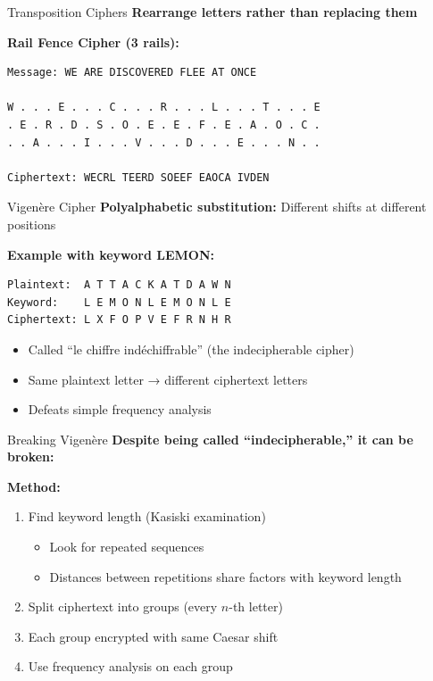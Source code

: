 \documentclass{beamer}
\begin{document}
\begin{frame}[fragile]{Transposition Ciphers}
\textbf{Rearrange letters rather than replacing them}

\vspace{0.3cm}
\textbf{Rail Fence Cipher (3 rails):}

\begin{verbatim}
Message: WE ARE DISCOVERED FLEE AT ONCE

W . . . E . . . C . . . R . . . L . . . T . . . E
. E . R . D . S . O . E . E . F . E . A . O . C .
. . A . . . I . . . V . . . D . . . E . . . N . .

Ciphertext: WECRL TEERD SOEEF EAOCA IVDEN
\end{verbatim}

\end{frame}

\begin{frame}[fragile]{Vigenère Cipher}
\textbf{Polyalphabetic substitution:} Different shifts at different positions

\vspace{0.3cm}
\textbf{Example with keyword LEMON:}
\begin{verbatim}
Plaintext:  A T T A C K A T D A W N
Keyword:    L E M O N L E M O N L E
Ciphertext: L X F O P V E F R N H R
\end{verbatim}

\vspace{0.3cm}
\begin{itemize}
    \item Called ``le chiffre indéchiffrable'' (the indecipherable cipher)
    \item Same plaintext letter → different ciphertext letters
    \item Defeats simple frequency analysis
\end{itemize}

\end{frame}

\begin{frame}{Breaking Vigenère}
\textbf{Despite being called ``indecipherable,'' it can be broken:}

\vspace{0.3cm}
\textbf{Method:}
\begin{enumerate}
    \item Find keyword length (Kasiski examination)
    \begin{itemize}
        \item Look for repeated sequences
        \item Distances between repetitions share factors with keyword length
    \end{itemize}
    \item Split ciphertext into groups (every $n$-th letter)
    \item Each group encrypted with same Caesar shift
    \item Use frequency analysis on each group
\end{enumerate}
\end{frame}
\end{document}
